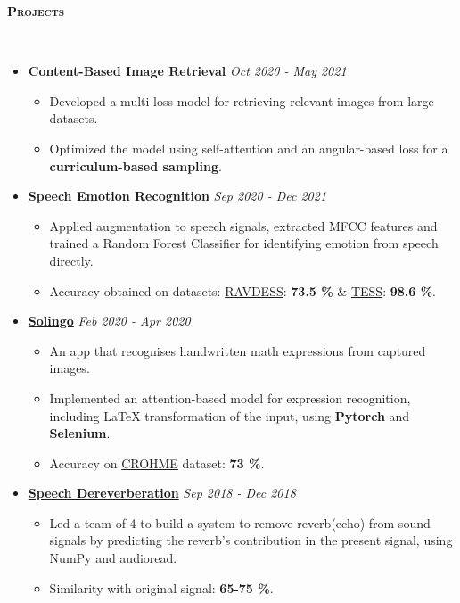 \documentclass[10pt]{article}
\renewcommand{\section}[1]{
\bigskip
  \begin{Large}
  {\textsc{\textbf{#1}}}
  \end{Large}
  \hrulefill
  \medskip
  \\
}
\newenvironment{lonemidlist}[1][\enskip\textbullet]%
        {\begin{itemize}[#1,leftmargin=*,parsep=0pt,itemsep=4pt,topsep=0pt,partopsep=0pt]}
        {\end{itemize}}
\begin{document}
\section{Projects}
\vspace{-3mm}
\label{sec:proj}
\begin{lonemidlist}
\item\textbf{Content-Based Image Retrieval} \hfill {\textit{Oct 2020 - May 2021}}
\begin{itemize}
    \item Developed a multi-loss model for retrieving relevant images from large datasets.
    \item Optimized the model using self-attention and an angular-based loss for a \textbf{curriculum-based sampling}.
\end{itemize}
\item\href{https://github.com/Debapriya-Tula/NLP-Project}{\textbf{Speech Emotion Recognition}} \hfill {\textit{Sep 2020 - Dec 2021}}
\begin{itemize}
     \item Applied augmentation to speech signals, extracted MFCC features and trained a Random Forest Classifier for identifying emotion from speech directly.
     \item Accuracy obtained on datasets: \href{https://journals.plos.org/plosone/article?id=10.1371/journal.pone.0196391} {RAVDESS}: \textbf{73.5 \%} \& \href{https://tspace.library.utoronto.ca/handle/1807/24487} {TESS}: \textbf{98.6 \%}.
\end{itemize}
\item\href{https://github.com/Debapriya-Tula/Solve-it-in-a-go}{\textbf{Solingo}} \hfill {\textit{Feb 2020 - Apr 2020}}
\begin{itemize}
     \item An app that recognises handwritten math expressions from captured images.
     \item Implemented an attention-based model for expression recognition, including LaTeX transformation of the input, using \textbf{Pytorch} and \textbf{Selenium}.
     \item Accuracy on \href{https://researchdata.edu.au/crohme-competition-recognition-expressions-png/639782}{CROHME} dataset: \textbf{73 \%}.
\end{itemize}
\item\href{https://github.com/Debapriya-Tula/Speech_Dereverberation}{\textbf{Speech Dereverberation}} \hfill {\textit{Sep 2018 - Dec 2018}}
\begin{itemize}
     \item Led a team of 4 to build a system to remove reverb(echo) from sound signals by predicting the reverb’s contribution in the present signal, using NumPy and audioread.
     \item Similarity with original signal: \textbf{65-75 \%}.
\end{itemize}
\end{lonemidlist}
\end{document}
